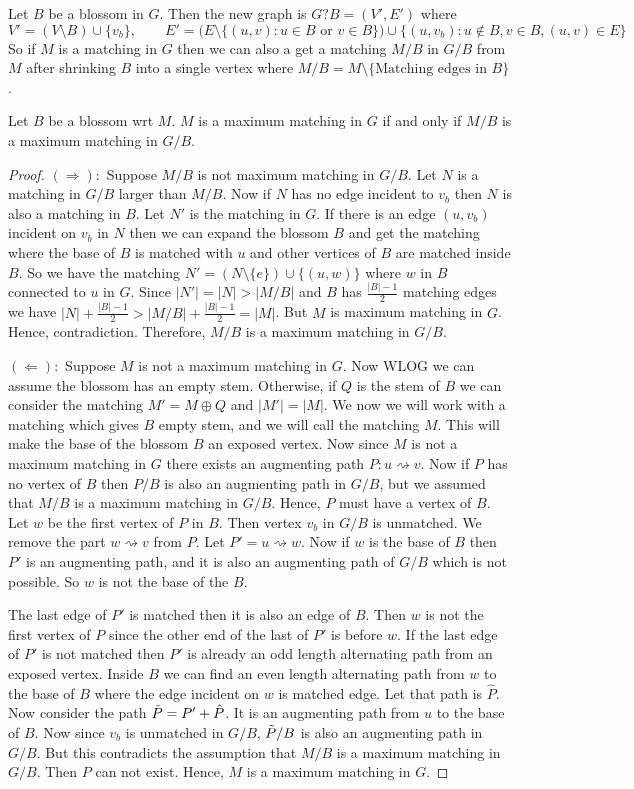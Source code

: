 Let $B$ be a blossom in $G$. Then the new graph is $G?B=(V',E')$ where $$V'=(V\setminus B)\cup \{v_b\},\qquad E'=\Big(E\setminus\{(u,v)\colon u\in B\text{ or }v\in B\}\Big)\cup \{(u,v_b)\colon u\notin B, v\in B, (u,v)\in E\}$$ So if $M$ is a matching in $G$ then we can also a get a matching $M/B$  in $G/B$ from $M$ after shrinking $B$ into  a single vertex where $M/B=M\setminus \{\text{Matching edges in $B$}\}$.
\begin{Theorem}{}{}
	Let $B$ be a blossom wrt $M$. $M$ is a maximum matching in $G$ if and only if $M/B$ is a maximum matching in $G/B$.
\end{Theorem}
\begin{proof}
	$(\Longrightarrow):$ Suppose $M/B$ is not maximum matching in $G/B$. Let $N$ is a matching in $G/B$ larger than $M/B$. Now if $N$ has no edge incident to $v_b$ then $N$ is also a matching in $B$. Let $N'$ is the matching in $G$. If there is an edge $(u,v_b)$ incident on $v_b$ in $N$ then we can expand the blossom $B$ and get the matching where the base of $B$ is matched with $u$ and other vertices of $B$ are matched inside $B$. So we have the matching $N'=(N\setminus\{e\})\cup \{(u,w)\}$ where $w$ in $B$ connected to $u$ in $G$. Since $|N'|=|N|>|M/B|$ and $B$ has $\frac{|B|-1}2$ matching edges we have $|N|+\frac{|B|-1}2>|M/B|+\frac{|B|-1}2=|M|$. But $M$ is maximum matching in $G$. Hence, contradiction. Therefore, $M/B$ is a maximum matching in $G/B$.

	$(\Longleftarrow):$ Suppose $M$ is not a maximum matching in $G$. Now WLOG we can assume the blossom has an empty stem. Otherwise, if $Q$ is the stem of $B$ we can consider the matching $M'=M\oplus Q$ and $|M'|=|M|$. We now we will work with a matching which gives $B$ empty stem, and we will call the matching $M$. This will make the base of the blossom $B$ an exposed vertex. Now since $M$ is not a maximum matching in $G$ there exists an augmenting path $P:u\rightsquigarrow v$. Now if $P$ has no vertex of $B$ then $P/B$ is also an augmenting path in $G/B$, but we assumed that $M/B$ is a maximum matching in $G/B$. Hence, $P$ must have a vertex of $B$. Let $w$ be the first vertex of $P$ in $B$. Then vertex $v_b$ in $G/B$ is unmatched. We remove the part $w\rightsquigarrow v$ from $P$. Let $P'=u\rightsquigarrow w$. Now if $w$ is the base of $B$ then $P'$ is an augmenting path, and it is also an augmenting path of $G/B$ which is not possible. So $w$ is not the base of the $B$.

	The last  edge of $P'$ is matched then it is also an edge of $B$. Then $w$ is not the first vertex of $P$ since the other end of the last of $P'$ is before $w$. If the last edge of $P'$ is not matched then $P'$ is already an odd length alternating path from an exposed vertex. Inside $B$ we can find an even length alternating path from $w$ to the base of $B$ where the edge incident on $w$ is matched edge. Let that path is $\hat{P}$. Now consider the path $\tilde{P}=P'+\hat{P}$. It is an augmenting path from $u$ to the base of $B$. Now since $v_b$ is unmatched in $G/B$, $\tilde{P}/B$ is also an augmenting path in $G/B$. But this contradicts the assumption that $M/B$ is a maximum matching in $G/B$. Then $P$ can not exist. Hence, $M$ is a maximum matching in $G$.
\end{proof}

